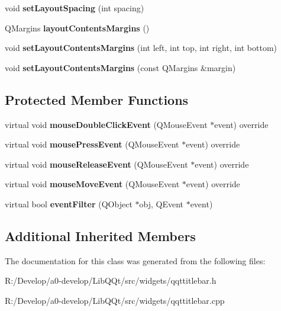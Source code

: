\begin{DoxyCompactItemize}
void {\bfseries set\+Layout\+Spacing} (int spacing)
\item 
\mbox{\label{class_q_qt_title_bar_a83e11fa3ef7deccfa5ebbeac3f9e1f75}} 
Q\+Margins {\bfseries layout\+Contents\+Margins} ()
\item 
\mbox{\label{class_q_qt_title_bar_a21c24b1f7679b453d65d8695e87487e8}} 
void {\bfseries set\+Layout\+Contents\+Margins} (int left, int top, int right, int bottom)
\item 
\mbox{\label{class_q_qt_title_bar_a5f8bb46f9194eb86d9b1a63b0958f1ac}} 
void {\bfseries set\+Layout\+Contents\+Margins} (const Q\+Margins \&margin)
\end{DoxyCompactItemize}
\subsection*{Protected Member Functions}
\begin{DoxyCompactItemize}
\item 
\mbox{\label{class_q_qt_title_bar_ac54efd76d0ab298ac66efb944c8ec37c}} 
virtual void {\bfseries mouse\+Double\+Click\+Event} (Q\+Mouse\+Event $\ast$event) override
\item 
\mbox{\label{class_q_qt_title_bar_a37b9d1794512a1c8697ab8606b2e2296}} 
virtual void {\bfseries mouse\+Press\+Event} (Q\+Mouse\+Event $\ast$event) override
\item 
\mbox{\label{class_q_qt_title_bar_a4809f304040309d216b7c4549d12d546}} 
virtual void {\bfseries mouse\+Release\+Event} (Q\+Mouse\+Event $\ast$event) override
\item 
\mbox{\label{class_q_qt_title_bar_a552448bdeb86056ee704cd179662bcbc}} 
virtual void {\bfseries mouse\+Move\+Event} (Q\+Mouse\+Event $\ast$event) override
\item 
\mbox{\label{class_q_qt_title_bar_a3e496a41334b9621c2083e9b00cafce1}} 
virtual bool {\bfseries event\+Filter} (Q\+Object $\ast$obj, Q\+Event $\ast$event)
\end{DoxyCompactItemize}
\subsection*{Additional Inherited Members}


The documentation for this class was generated from the following files\+:\begin{DoxyCompactItemize}
\item 
R\+:/\+Develop/a0-\/develop/\+Lib\+Q\+Qt/src/widgets/qqttitlebar.\+h\item 
R\+:/\+Develop/a0-\/develop/\+Lib\+Q\+Qt/src/widgets/qqttitlebar.\+cpp\end{DoxyCompactItemize}
